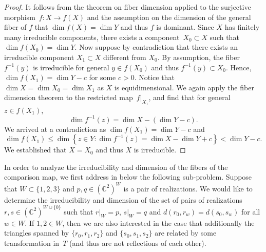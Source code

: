 \documentclass[12pt]{article}
\theoremstyle{definition}
\newtheorem{remark}[lemma]{Remark}
\newcommand{\END}{\hfill $\vartriangleleft$}
\newcommand{\st}{such that }
\renewcommand{\c}{\colon}
\newcommand{\set}[2]{\left\{#1:#2\right\}}
\newcommand{\C}{{\mathbb{C}}}
\begin{document}
\begin{proof}
It follows from the theorem on fiber dimension
\citep[\textsection I.6.3, Theorem~7]{1994} applied to the surjective morphism~$f\c X\to f(X)$
and the assumption on the dimension of the general fiber of $f$
that $\dim f(X)=\dim Y$ and thus $f$ is dominant.
Since $X$ has finitely many irreducible components, there
exists a component~$X_0\subset X$ \st $\dim f(X_0)=\dim Y$.
Now suppose by contradiction that there exists an irreducible component $X_1\subset X$
different from $X_0$.
By assumption, the fiber~$f^{-1}(y)$ is irreducible for general $y\in f(X_0)$
and thus $f^{-1}(y)\subset X_0$.
Hence, $\dim f(X_1)=\dim Y-c$ for some $c>0$.
Notice that $\dim X=\dim X_0=\dim X_1$ as $X$ is equidimensional.
We again apply the fiber dimension theorem
\citep[\textsection I.6.3, Theorem~7]{1994}
to the restricted map~$f|_{X_1}$,
and find that for general~$z\in f(X_1)$,
\[
\dim f^{-1}(z)=\dim X-(\dim Y-c).
\]
We arrived at a contradiction as $\dim f(X_1)=\dim Y-c$ and
\[
\dim f(X_1)\leq \dim\set{z\in Y}{\dim f^{-1}(z)=\dim X-\dim Y+c}<\dim Y-c.
\]
We established that $X=X_0$ and thus $X$ is irreducible.
\end{proof}

In order to analyze the irreducibility and dimension of the fibers
of the comparison map, we first address in  below the following sub-problem.
Suppose that
$W\subset\{1,2,3\}$ and $p,q\in(\C^2)^W$ is a pair of realizations.
We would like to determine the irreducibility and dimension of the set of pairs of realizations
$r,s\in (\C^2)^{W\cup\{0\}}$
\st $r|_W=p$, $s|_W=q$ and
$d(r_0,r_w)=d(s_0,s_w)$ for all $w\in W$.
If $1,2\in W$, then we are also interested in the case that
additionally the triangles spanned by $\{r_0,r_1,r_2\}$ and $\{s_0,s_1,s_2\}$
are related by some transformation in~$T$ (and thus are not reflections of each other).
\end{document}
